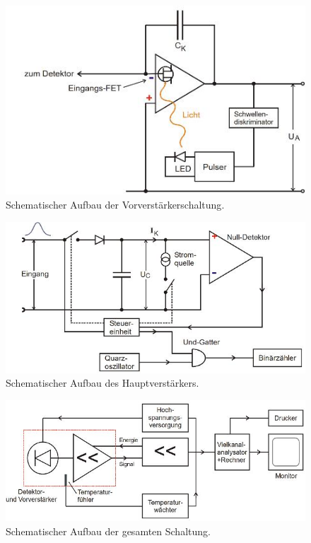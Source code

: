 \begin{figure}
	\centering
	\includegraphics[width=\linewidth-70pt,height=\textheight-70pt,keepaspectratio]{content/images/Schaltung.jpg}
	\caption{Schematischer Aufbau der Vorverstärkerschaltung\cite{V18}.}
	\label{fig:Schalt}
\end{figure}
\begin{figure}
	\centering
	\includegraphics[width=\linewidth-70pt,height=\textheight-70pt,keepaspectratio]{content/images/Schaltung2.jpg}
	\caption{Schematischer Aufbau des Hauptverstärkers\cite{V18}.}
	\label{fig:Schalt2}
\end{figure}
\begin{figure}
	\centering
	\includegraphics[width=\linewidth-70pt,height=\textheight-70pt,keepaspectratio]{content/images/Schaltung3.jpg}
	\caption{Schematischer Aufbau der gesamten Schaltung\cite{V18}.}
	\label{fig:Schalt3}
\end{figure}
